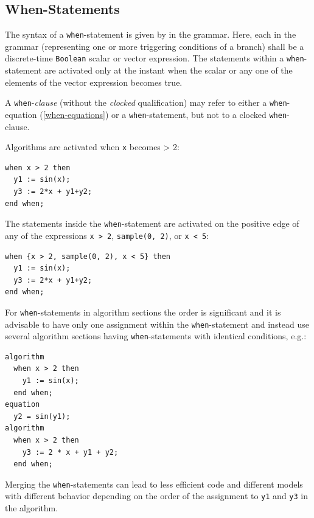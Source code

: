 \subsection{When-Statements}\label{when-statements}

The syntax of a \lstinline!when!-statement is given by  in the grammar.
Here, each  in the grammar (representing one or more triggering conditions of a branch) shall be a discrete-time \lstinline!Boolean! scalar or vector expression.
The statements within a \lstinline!when!-statement are activated only at the instant when the scalar or any one of the elements of the vector expression becomes true.

A \lstinline!when!-\emph{clause} (without the \emph{clocked} qualification) may refer to either a \lstinline!when!-equation (\cref{when-equations}) or a \lstinline!when!-statement, but not to a clocked \lstinline!when!-clause.

\begin{example}
Algorithms are activated when \lstinline!x! becomes \textgreater{} 2:
\begin{lstlisting}[language=modelica]
when x > 2 then
  y1 := sin(x);
  y3 := 2*x + y1+y2;
end when;
\end{lstlisting}
The statements inside the \lstinline!when!-statement are activated on the positive edge of any of the expressions \lstinline!x > 2!, \lstinline!sample(0, 2)!, or \lstinline!x < 5!:
\begin{lstlisting}[language=modelica]
when {x > 2, sample(0, 2), x < 5} then
  y1 := sin(x);
  y3 := 2*x + y1+y2;
end when;
\end{lstlisting}
For \lstinline!when!-statements in algorithm sections the order is significant and it is advisable to have only one assignment within the \lstinline!when!-statement and instead use several algorithm sections having \lstinline!when!-statements with identical conditions, e.g.:
\begin{lstlisting}[language=modelica]
algorithm
  when x > 2 then
    y1 := sin(x);
  end when;
equation
  y2 = sin(y1);
algorithm
  when x > 2 then
    y3 := 2 * x + y1 + y2;
  end when;
\end{lstlisting}
Merging the \lstinline!when!-statements can lead to less efficient code and different models with different behavior depending on the order of the assignment to \lstinline!y1! and \lstinline!y3! in the algorithm.
\end{example}

